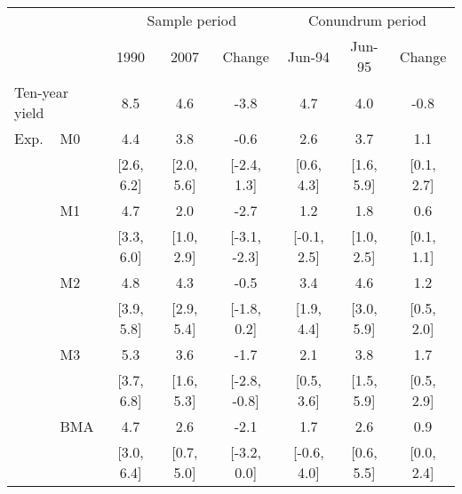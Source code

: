 \begin{tabular}{ll|ccc|ccc} \hline \hline 
 && \multicolumn{3}{c|}{Sample period} & \multicolumn{3}{c}{Conundrum period} \\ 
 && 1990 & 2007 & Change & Jun-94 & Jun-95 & Change  \\ \hline 
\multicolumn{2}{l|}{Ten-year yield} & 8.5  & 4.6  & -3.8  & 4.7  & 4.0  & -0.8 \\ 
 \hline 
Exp. 
&M0& 4.4 & 3.8 & -0.6 & 2.6 & 3.7 & 1.1 \\ 
&& [2.6, 6.2]& [2.0, 5.6]& [-2.4, 1.3]& [0.6, 4.3]& [1.6, 5.9]& [0.1, 2.7]\\ 
&M1& 4.7 & 2.0 & -2.7 & 1.2 & 1.8 & 0.6 \\ 
&& [3.3, 6.0]& [1.0, 2.9]& [-3.1, -2.3]& [-0.1, 2.5]& [1.0, 2.5]& [0.1, 1.1]\\ 
&M2& 4.8 & 4.3 & -0.5 & 3.4 & 4.6 & 1.2 \\ 
&& [3.9, 5.8]& [2.9, 5.4]& [-1.8, 0.2]& [1.9, 4.4]& [3.0, 5.9]& [0.5, 2.0]\\ 
&M3& 5.3 & 3.6 & -1.7 & 2.1 & 3.8 & 1.7 \\ 
&& [3.7, 6.8]& [1.6, 5.3]& [-2.8, -0.8]& [0.5, 3.6]& [1.5, 5.9]& [0.5, 2.9]\\ 
&BMA& 4.7 & 2.6 & -2.1 & 1.7 & 2.6 & 0.9 \\ 
&& [3.0, 6.4]& [0.7, 5.0]& [-3.2, 0.0]& [-0.6, 4.0]& [0.6, 5.5]& [0.0, 2.4]\\ 
\hline \hline 
 \end{tabular}
